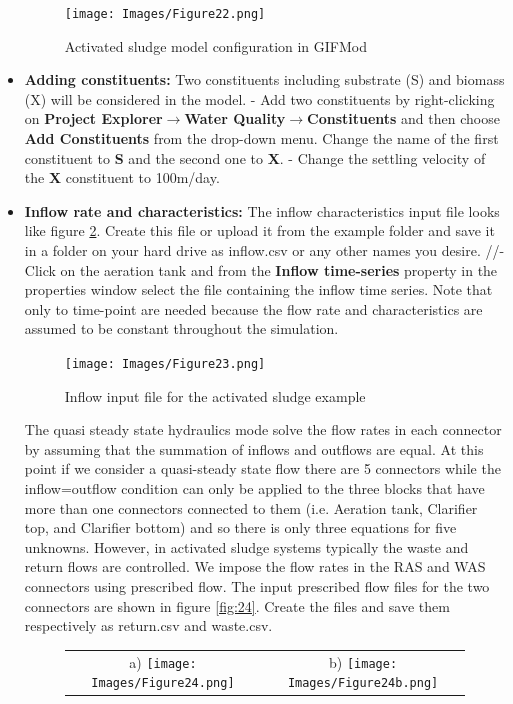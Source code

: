 \begin{itemize}
\begin{figure}
\begin{center}
\texttt{[image: Images/Figure22.png]} \\
\caption{Activated sludge model configuration in GIFMod}\label{fig:22}
\end{center}
\end{figure}
\item \textbf{Adding constituents: } Two constituents  including substrate (S) and biomass (X) will be considered in the model.
- Add two constituents by right-clicking on \textbf{Project Explorer}$\rightarrow$\textbf{Water Quality}$\rightarrow$\textbf{Constituents} and then choose \textbf{Add Constituents} from the drop-down menu. Change the name of the first constituent to \textbf{S} and the second one to \textbf{X}. 
- Change the settling velocity of the \textbf{X} constituent to 100m/day. 
\item \textbf{Inflow rate and characteristics: } The inflow characteristics input file looks like figure \ref{fig:23}. Create this file or upload it from the example folder and save it in a folder on your hard drive as inflow.csv or any other names you desire. 
//- Click on the aeration tank and from the \textbf{Inflow time-series} property in the properties window select the file containing the inflow time series. Note that only to time-point are needed because the flow rate and characteristics are assumed to be constant throughout the simulation. 
\begin{figure}
\begin{center}
\texttt{[image: Images/Figure23.png]} \\
\caption{Inflow input file for the activated sludge example}\label{fig:23}
\end{center}
\end{figure}
The quasi steady state hydraulics mode solve the flow rates in each connector by assuming that the summation of inflows and outflows are equal. At this point if we consider a quasi-steady state flow there are 5 connectors while the inflow=outflow condition can only be applied to the three blocks that have more than one connectors connected to them (i.e. Aeration tank, Clarifier top, and Clarifier bottom) and so there is only three equations for five unknowns. However, in activated sludge systems typically the waste and return flows are controlled. We impose the flow rates in the RAS and WAS connectors using prescribed flow. The input prescribed flow files for the two connectors are shown in figure \ref{fig:24}. Create the files and save them respectively as return.csv and waste.csv. 
\begin{figure}
\begin{center}
\begin{tabular}{c c}
a) \texttt{[image: Images/Figure24.png]} & b) \texttt{[image: Images/Figure24b.png]}\\
\end{tabular}


\end{center}
\end{figure}
\end{itemize}
